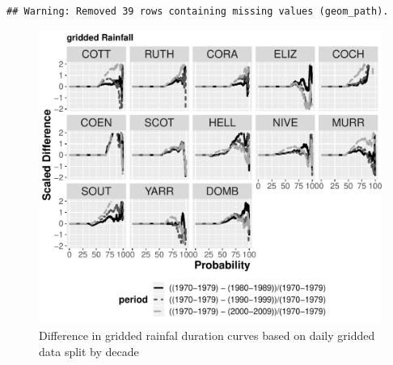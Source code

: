 \documentclass[]{article}
\begin{document}
\begin{verbatim}
## Warning: Removed 39 rows containing missing values (geom_path).
\end{verbatim}

\begin{figure}[htbp]
\centering
\includegraphics{4.FDC_Analysis_files/figure-latex/FDC_gridRain-1.pdf}
\caption{Difference in gridded rainfal duration curves based on daily
gridded data split by decade}
\end{figure}
\end{document}
